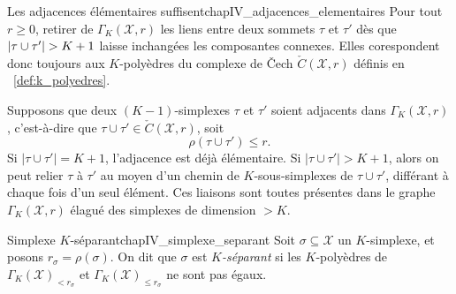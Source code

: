 
\begin{Fait}{Les adjacences élémentaires suffisent}{chapIV_adjacences_elementaires}
Pour tout $r\ge0$, retirer de $\Gamma_K(\mathcal X,r)$ les liens entre deux sommets  $\tau$ et $\tau'$ dès que $\lvert \tau \cup \tau' \rvert > K+1$ laisse inchangées les composantes connexes. Elles corespondent donc toujours aux $K$-polyèdres du complexe de \v Cech $\check C(\mathcal X,r)$ définis en \Def~\ref{def:k_polyedres}.
\end{Fait}

\begin{Preuve}
Supposons que deux $(K-1)$-simplexes $\tau$ et $\tau'$ soient adjacents dans $\Gamma_K(\mathcal X,r)$, c'est-à-dire que $\tau \cup \tau' \in\check C(\mathcal X,r)$, soit
\[
    \rho(\tau\cup\tau') \le r .
\]
Si $|\tau \cup \tau'|=K+1$, l'adjacence est déjà élémentaire. Si $|\tau \cup \tau'|>K+1$, alors on peut relier $\tau$ à $\tau'$ au moyen d'un chemin de $K$-sous-simplexes de $\tau \cup \tau'$, différant à chaque fois d'un seul élément. Ces liaisons sont toutes présentes dans le graphe $\Gamma_K(\mathcal X,r)$ élagué des simplexes de dimension $>K$.
\end{Preuve}


\begin{Definition}{Simplexe $K$-séparant}{chapIV_simplexe_separant}
Soit $\sigma\subseteq\mathcal X$ un $K$-simplexe, et posons $r_\sigma=\rho(\sigma)$.
On dit que $\sigma$ est \emph{$K$-séparant} si les $K$-polyèdres de $\Gamma_K(\mathcal X)_{< r_\sigma}$ et $\Gamma_K(\mathcal X)_{\le r_\sigma}$ ne sont pas égaux.
\end{Definition}


